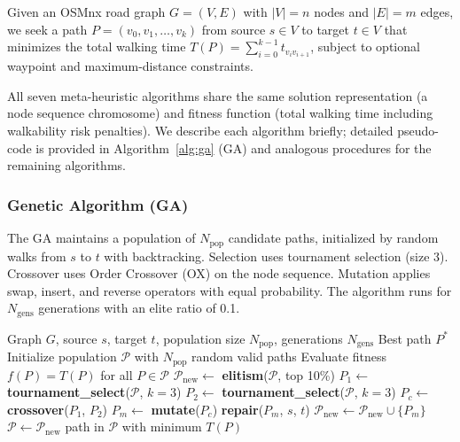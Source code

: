 \documentclass[journal]{IEEEtran}
\begin{document}
Given an OSMnx road graph $G = (V, E)$ with $|V| = n$ nodes and $|E| = m$ edges, we seek a path $P = (v_0, v_1, \ldots, v_k)$ from source $s \in V$ to target $t \in V$ that minimizes the total walking time $T(P) = \sum_{i=0}^{k-1} t_{v_i v_{i+1}}$, subject to optional waypoint and maximum-distance constraints.

All seven meta-heuristic algorithms share the same solution representation (a node sequence chromosome) and fitness function (total walking time including walkability risk penalties). We describe each algorithm briefly; detailed pseudo-code is provided in Algorithm~\ref{alg:ga} (GA) and analogous procedures for the remaining algorithms.

\subsubsection{Genetic Algorithm (GA)}
The GA maintains a population of $N_{\text{pop}}$ candidate paths, initialized by random walks from $s$ to $t$ with backtracking. Selection uses tournament selection (size 3). Crossover uses Order Crossover (OX) on the node sequence. Mutation applies swap, insert, and reverse operators with equal probability. The algorithm runs for $N_{\text{gens}}$ generations with an elite ratio of 0.1.

\begin{algorithm}[!ht]
\caption{Genetic Algorithm for Shortest Path}
\label{alg:ga}
\begin{algorithmic}[1]
\Require Graph $G$, source $s$, target $t$, population size $N_{\text{pop}}$, generations $N_{\text{gens}}$
\Ensure Best path $P^*$
\State Initialize population $\mathcal{P}$ with $N_{\text{pop}}$ random valid paths
\State Evaluate fitness $f(P) = T(P)$ for all $P \in \mathcal{P}$
  \State $\mathcal{P}_{\text{new}} \leftarrow$ \textbf{elitism}($\mathcal{P}$, top 10\%)
    \State $P_1 \leftarrow$ \textbf{tournament\_select}($\mathcal{P}$, $k=3$)
    \State $P_2 \leftarrow$ \textbf{tournament\_select}($\mathcal{P}$, $k=3$)
    \State $P_c \leftarrow$ \textbf{crossover}($P_1$, $P_2$) 
    \State $P_m \leftarrow$ \textbf{mutate}($P_c$) 
    \State \textbf{repair}($P_m$, $s$, $t$) 
    \State $\mathcal{P}_{\text{new}} \leftarrow \mathcal{P}_{\text{new}} \cup \{P_m\}$
  \EndWhile
  \State $\mathcal{P} \leftarrow \mathcal{P}_{\text{new}}$
\EndFor
\State \Return path in $\mathcal{P}$ with minimum $T(P)$
\end{algorithmic}
\end{algorithm}
\end{document}
